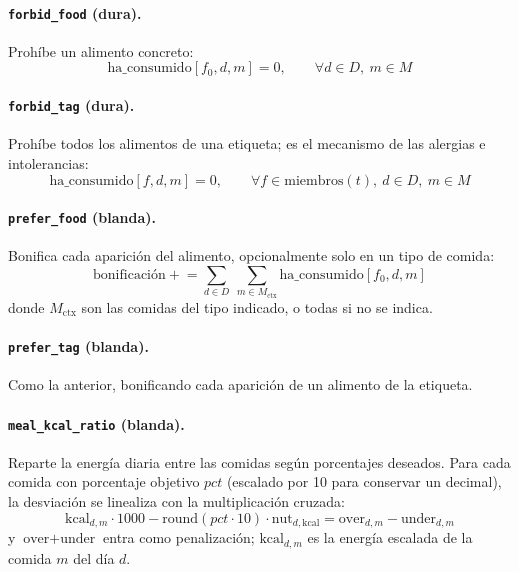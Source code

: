 \paragraph{\texttt{forbid\_food} (dura).} Prohíbe un alimento concreto:
\begin{equation*}
\text{ha\_consumido}[f_0,d,m] = 0, \qquad \forall d \in D,\ m \in M
\end{equation*}

\paragraph{\texttt{forbid\_tag} (dura).} Prohíbe todos los alimentos de una etiqueta; es el mecanismo de las alergias e intolerancias:
\begin{equation*}
\text{ha\_consumido}[f,d,m] = 0, \qquad \forall f \in \text{miembros}(t),\ d \in D,\ m \in M
\end{equation*}

\paragraph{\texttt{prefer\_food} (blanda).} Bonifica cada aparición del alimento, opcionalmente solo en un tipo de comida:
\begin{equation*}
\text{bonificación} \mathrel{+}= \sum_{d \in D}\ \sum_{m \in M_{\text{ctx}}} \text{ha\_consumido}[f_0,d,m]
\end{equation*}
donde $M_{\text{ctx}}$ son las comidas del tipo indicado, o todas si no se indica.

\paragraph{\texttt{prefer\_tag} (blanda).} Como la anterior, bonificando cada aparición de un alimento de la etiqueta.

\paragraph{\texttt{meal\_kcal\_ratio} (blanda).} Reparte la energía diaria entre las comidas según porcentajes deseados. Para cada comida con porcentaje objetivo $pct$ (escalado por 10 para conservar un decimal), la desviación se linealiza con la multiplicación cruzada:
\begin{equation*}
\text{kcal}_{d,m} \cdot 1000 - \text{round}(pct \cdot 10) \cdot \text{nut}_{d,\text{kcal}} = \text{over}_{d,m} - \text{under}_{d,m}
\end{equation*}
y $\text{over} + \text{under}$ entra como penalización; $\text{kcal}_{d,m}$ es la energía escalada de la comida $m$ del día $d$.

